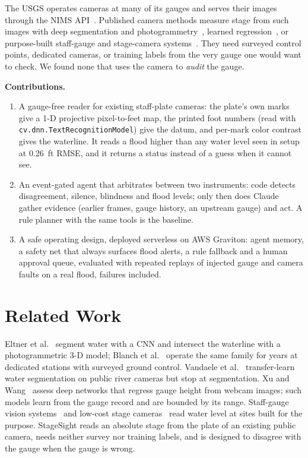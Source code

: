 \documentclass[conference,10pt,letterpaper]{IEEEtran}
\newcommand{\cv}[1]{\texttt{\small cv.#1}}
\begin{document}
The USGS operates cameras at many of its gauges and serves their images through the NIMS
API~\cite{nims}. Published camera methods measure stage from such images with deep
segmentation and photogrammetry~\cite{eltner2021,blanch2026}, learned
regression~\cite{vandaele2021,xu2025}, or purpose-built staff-gauge and stage-camera
systems~\cite{sabbatini2021,noto2022}. They need surveyed control points, dedicated cameras, or
training labels from the very gauge one would want to check. We found none that uses the camera
to \emph{audit} the gauge.

\textbf{Contributions.}
\begin{enumerate}
\item A gauge-free reader for existing staff-plate cameras: the plate's own marks give a 1-D
projective pixel-to-feet map, the printed foot numbers (read with \cv{dnn.TextRecognitionModel})
give the datum, and per-mark color contrast gives the waterline. It reads a flood higher than any
water level seen in setup at 0.26~ft RMSE, and it returns a status instead of a guess when it cannot see.
\item An event-gated agent that arbitrates between two instruments: code detects disagreement,
silence, blindness and flood levels; only then does Claude gather evidence (earlier frames, gauge
history, an upstream gauge) and act. A rule planner with the same tools is the baseline.
\item A safe operating design, deployed serverless on AWS Graviton: agent memory, a safety net
that always surfaces flood alerts, a rule fallback and a human approval queue, evaluated with
repeated replays of injected gauge and camera faults on a real flood, failures included.
\end{enumerate}

\section{Related Work}
Eltner et al.~\cite{eltner2021} segment water with a CNN and intersect the waterline with a
photogrammetric 3-D model; Blanch et al.~\cite{blanch2026} operate the same family for years at
dedicated stations with surveyed ground control. Vandaele et al.~\cite{vandaele2021}
transfer-learn water segmentation on public river cameras but stop at segmentation. Xu and
Wang~\cite{xu2025} assess deep networks that regress gauge height from webcam images; such
models learn from the gauge record and are bounded by its range. Staff-gauge vision
systems~\cite{sabbatini2021} and low-cost stage cameras~\cite{noto2022} read water level at
sites built for the purpose. StageSight reads an absolute stage from the plate of an existing
public camera, needs neither survey nor training labels, and is designed to disagree with the
gauge when the gauge is wrong.
\end{document}
